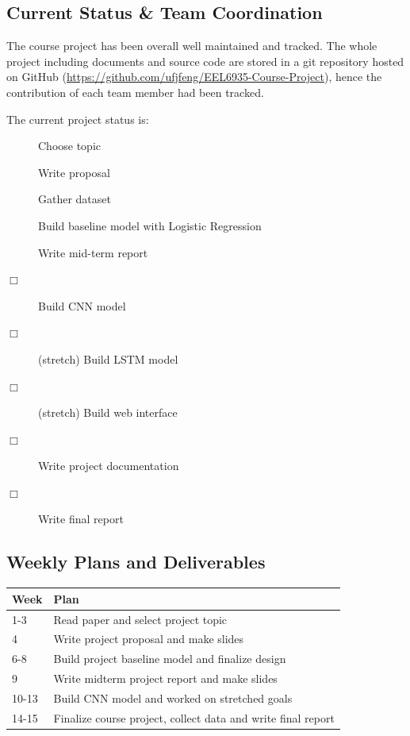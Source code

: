 \documentclass[conference]{IEEEtran}
\begin{document}
\subsection{Current Status \& Team Coordination}
\label{manage:status}
    The course project has been overall well maintained and tracked. 
    The whole project including documents and source code are stored
    in a git repository hosted on GitHub 
    (\url{https://github.com/ufjfeng/EEL6935-Course-Project}),
    hence the contribution of each team member had been tracked.
    
    The current project status is:
    \begin{description}
        \item[\CheckedBox] Choose topic
        \item[\CheckedBox] Write proposal
        \item[\CheckedBox] Gather dataset
        \item[\CheckedBox] Build baseline model with Logistic Regression
        \item[\CheckedBox] Write mid-term report 
        \item[$\Box$] Build CNN model
        \item[$\Box$] (stretch) Build LSTM model
        \item[$\Box$] (stretch) Build web interface
        \item[$\Box$] Write project documentation
        \item[$\Box$] Write final report
    \end{description}

\subsection{Weekly Plans and Deliverables}
\label{manage:plan}

    \begin{center}
        \begin{tabular}{| l | p{7cm} |}
        \hline
        Week & Plan \\ \hline
        1-3 & Read paper and select project topic \\ \hline
        4 & Write project proposal and make slides \\ \hline
        6-8 & Build project baseline model and finalize design \\ \hline
        9 & Write midterm project report and make slides \\ \hline
        10-13 & Build CNN model and worked on stretched goals \\ \hline
        14-15 & Finalize course project, collect data and write final report \\ \hline
        \end{tabular}
    \end{center}
\end{document}

